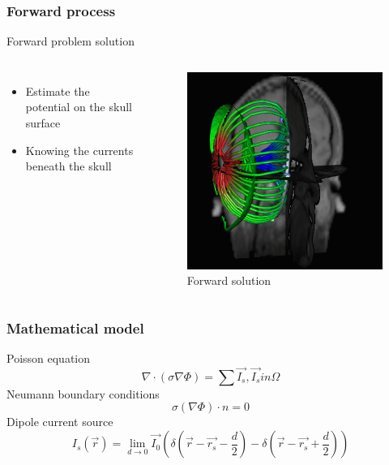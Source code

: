 \documentclass{beamer}
\begin{document}
\begin{frame}
    \frametitle{Forward process}
    Forward problem solution
    \begin{columns}
        \begin{itemize}
            \item Estimate the potential on the skull surface
            \item Knowing the currents beneath the skull
        \end{itemize}

        \begin{figure}[H]
            \centering
            \includegraphics[height=0.5\textheight]{forward_solution.png}
            \caption{Forward solution}
            \label{fig: Forward solution}
        \end{figure}

    \end{columns}
\end{frame}

\begin{frame}
    \frametitle{Mathematical model}
    Poisson equation
    \begin{equation}
        \nabla \cdot (\sigma \nabla \Phi) = \sum \vec{I_{s}}, \vec{I_{s}} in \Omega
    \end{equation}
    Neumann boundary conditions
    \begin{equation}
        \sigma (\nabla \Phi) \cdot n = 0
    \end{equation}
    Dipole current source
    \begin{equation}
        I_{s}(\vec{r}) = \lim_{d \rightarrow 0} \vec{I_{0}}
        ( \delta (\vec{r} - \vec{r_{s}} - \frac{d}{2}) - \delta (\vec{r} - \vec{r_{s}} + \frac{d}{2}) )
    \end{equation}
\end{frame}
\end{document}
